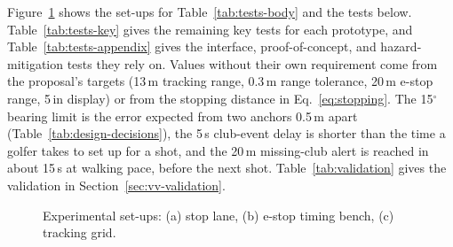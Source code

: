 \label{app:tests}

Figure~\ref{fig:setups} shows the set-ups for Table~\ref{tab:tests-body} and the tests below. Table~\ref{tab:tests-key} gives the remaining key tests for each prototype, and Table~\ref{tab:tests-appendix} gives the interface, proof-of-concept, and hazard-mitigation tests they rely on. Values without their own requirement come from the proposal's targets (13\,m tracking range, 0.3\,m range tolerance, 20\,m e-stop range, 5\,in display) or from the stopping distance in Eq.~\eqref{eq:stopping}. The 15$^\circ$ bearing limit is the error expected from two anchors 0.5\,m apart (Table~\ref{tab:design-decisions}), the 5\,s club-event delay is shorter than the time a golfer takes to set up for a shot, and the 20\,m missing-club alert is reached in about 15\,s at walking pace, before the next shot. Table~\ref{tab:validation} gives the validation in Section~\ref{sec:vv-validation}.

\begin{figure}[H]
\centering

\caption{Experimental set-ups: (a) stop lane, (b) e-stop timing bench, (c) tracking grid.}
\label{fig:setups}
\end{figure}

